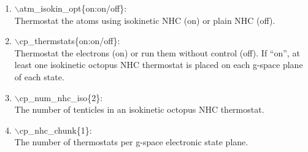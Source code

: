 \documentclass[12pt]{article}
\begin{document}
\begin{enumerate}
 \vspace{0.15in}
 \item   $\backslash$atm\_isokin\_opt\{on:on/off\}: \\
    Thermostat the atoms using isokinetic NHC (on) or plain NHC (off).

 \vspace{0.15in}
 \item   $\backslash$cp\_thermstats\{on:on/off\}: \\
    Thermostat the electrons (on) or run them without control (off).
    If ``on'', at least one isokinetic octopus NHC thermostat is placed on each
    g-space plane of each state.

 \vspace{0.15in}
 \item   $\backslash$cp\_num\_nhc\_iso\{2\}: \\
    The number of tenticles in an isokinetic octopus NHC thermostat.

 \vspace{0.15in}
 \item   $\backslash$cp\_nhc\_chunk\{1\}: \\
    The number of thermostats per g-space electronic state plane.
\end{enumerate}

\newpage
\end{document}
